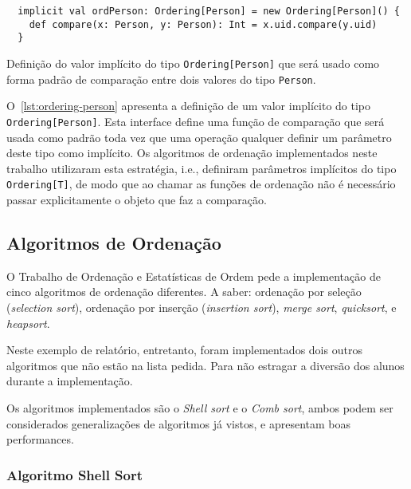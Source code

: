 \documentclass[a4paper,12pt]{scrartcl}
\begin{document}
\begin{listing}[h]
\begin{verbatim}
  implicit val ordPerson: Ordering[Person] = new Ordering[Person]() {
    def compare(x: Person, y: Person): Int = x.uid.compare(y.uid)
  }
\end{verbatim}
\caption[Declaração implícita de \texttt{Ordering[Person]}.]{Definição do valor
implícito do tipo \texttt{Ordering[Person]} que será usado como forma
padrão de comparação entre dois valores do tipo \texttt{Person}.}
\label{lst:ordering-person}
\end{listing}

O~\autoref{lst:ordering-person} apresenta a definição de um valor implícito do
tipo \texttt{Ordering[Person]}. Esta interface define uma função de
comparação que será usada como padrão toda vez que uma operação qualquer definir
um parâmetro deste tipo como implícito. Os algoritmos de ordenação implementados
neste trabalho utilizaram esta estratégia, i.e., definiram parâmetros implícitos
do tipo \texttt{Ordering[T]}, de modo que ao chamar as funções de
ordenação não é necessário passar explicitamente o objeto que faz a comparação.


\subsection{Algoritmos de Ordenação}
\label{sec:algor-ordenacao}

O Trabalho de Ordenação e Estatísticas de Ordem pede a implementação de cinco
algoritmos de ordenação diferentes. A saber: ordenação por seleção
(\emph{selection sort}), ordenação por inserção (\emph{insertion sort}),
\emph{merge sort}, \emph{quicksort}, e \emph{heapsort}.

Neste exemplo de relatório, entretanto, foram implementados dois outros
algoritmos que não estão na lista pedida. Para não estragar a diversão dos
alunos durante a implementação.

Os algoritmos implementados são o \emph{Shell sort} e o \emph{Comb sort}, ambos
podem ser considerados generalizações de algoritmos já vistos, e apresentam boas
performances.


\subsubsection{Algoritmo Shell Sort}
\label{sec:algoritmo-shell-sort}
\end{document}

